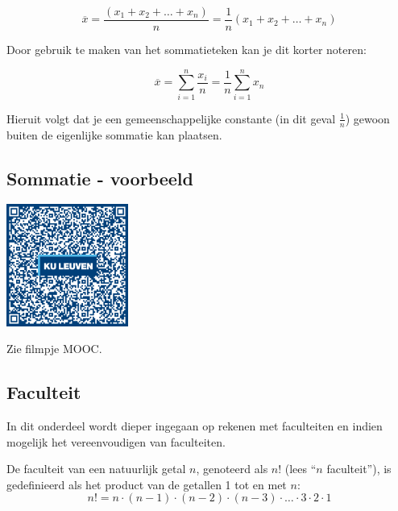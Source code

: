 \begin{equation*}
\overline{x} = \frac{(x_1+x_2+\ldots+x_n)}{n}=\frac{1}{n}(x_1+x_2+\ldots+x_n)
\end{equation*}

Door gebruik te maken van het sommatieteken kan je dit korter noteren:

\begin{equation*}
\overline{x}=\sum_{i=1}^{n}\frac{x_i}{n} = \frac{1}{n} \sum_{i=1}^{n} x_n
\end{equation*}

Hieruit volgt dat je een gemeenschappelijke constante (in dit geval $\frac{1}{n}$) gewoon buiten de eigenlijke sommatie kan plaatsen.



\subsection{Sommatie - voorbeeld}
\begin{minipage}{.25\linewidth}
	\raggedright
	\includegraphics[width=4cm]{1_elem_rekenvaardigheden_A/inputs/QR_Code_SOMMATIE_module_1new}
\end{minipage}
\begin{minipage}{.7\linewidth}
	Zie filmpje MOOC.
\end{minipage}

\subsection{Faculteit}
In dit onderdeel wordt dieper ingegaan op rekenen met faculteiten en indien mogelijk het vereenvoudigen van faculteiten.

\begin{definitie}
	De faculteit van een natuurlijk getal $n$, genoteerd als $n!$ (lees “$n$ faculteit”), is gedefinieerd als het product van de getallen 1 tot en met $n$:
	\begin{equation*}
	n!=n\cdot(n-1)\cdot(n-2)\cdot(n-3)\cdot\ldots\cdot 3\cdot 2\cdot 1
	\end{equation*}
\end{definitie}

